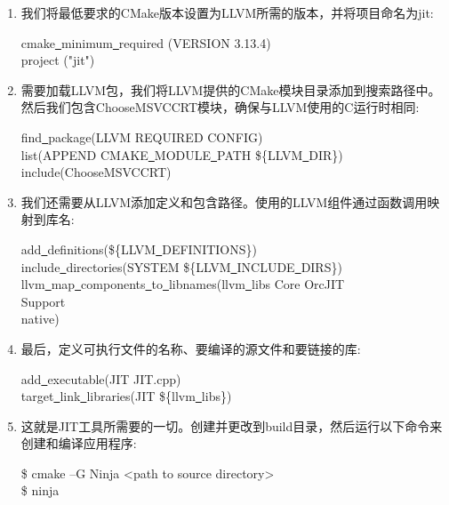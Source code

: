 \begin{enumerate}
\item 我们将最低要求的CMake版本设置为LLVM所需的版本，并将项目命名为jit:
\begin{tcolorbox}[colback=white,colframe=black]
cmake\underline{~}minimum\underline{~}required (VERSION 3.13.4) \\
project ("jit")
\end{tcolorbox}

\item 需要加载LLVM包，我们将LLVM提供的CMake模块目录添加到搜索路径中。然后我们包含ChooseMSVCCRT模块，确保与LLVM使用的C运行时相同:
\begin{tcolorbox}[colback=white,colframe=black]
find\underline{~}package(LLVM REQUIRED CONFIG) \\
list(APPEND CMAKE\underline{~}MODULE\underline{~}PATH \$\{LLVM\underline{~}DIR\}) \\
include(ChooseMSVCCRT)
\end{tcolorbox}

\item 我们还需要从LLVM添加定义和包含路径。使用的LLVM组件通过函数调用映射到库名:
\begin{tcolorbox}[colback=white,colframe=black]
add\underline{~}definitions(\$\{LLVM\underline{~}DEFINITIONS\}) \\
include\underline{~}directories(SYSTEM \$\{LLVM\underline{~}INCLUDE\underline{~}DIRS\}) \\
llvm\underline{~}map\underline{~}components\underline{~}to\underline{~}libnames(llvm\underline{~}libs Core OrcJIT \\
\hspace*{6cm}Support  \\
\hspace*{6cm}native)
\end{tcolorbox}

\item 最后，定义可执行文件的名称、要编译的源文件和要链接的库:
\begin{tcolorbox}[colback=white,colframe=black]
add\underline{~}executable(JIT JIT.cpp) \\
target\underline{~}link\underline{~}libraries(JIT \$\{llvm\underline{~}libs\})
\end{tcolorbox}

\item 这就是JIT工具所需要的一切。创建并更改到build目录，然后运行以下命令来创建和编译应用程序:
\begin{tcolorbox}[colback=white,colframe=black]
\$ cmake –G Ninja <path to source directory> \\
\$ ninja
\end{tcolorbox}

\end{enumerate}

